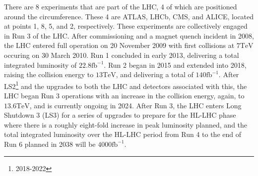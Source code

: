 There are 8 experiments that are part of the LHC, 4 of which are positioned around the circumference. These 4 are ATLAS, LHCb, CMS, and ALICE, located at points 1, 8, 5, and 2, respectively. These experiments are collectively engaged in Run 3 of the LHC. After commissioning and a magnet quench incident in 2008, the LHC entered full operation on 20 November 2009 with first collisions at $7\text{TeV}$ occuring on 30 March 2010. Run 1 concluded in early 2013, delivering a total integrated luminosity of $22.8\text{fb}^{-1}$. Run 2 began in 2015 and extended into 2018, raising the collision energy to $13\text{TeV}$, and delivering a total of $140\text{fb}^{-1}$. After LS2\footnote{2018-2022} and the upgrades to both the LHC and detectors associated with this, the LHC began Run 3 operations with an increase in the collision energy, again, to $13.6\text{TeV}$, and is currently ongoing in 2024. After Run 3, the LHC enters Long Shutdown 3 (LS3) for a series of upgrades to prepare for the HL-LHC phase where there is a roughly eight-fold increase in peak luminosity planned, and the total integrated luminosity over the HL-LHC period from Run 4 to the end of Run 6 planned in 2038 will be $4000\text{fb}^{-1}$.













